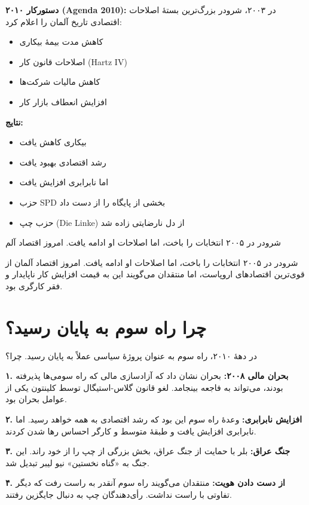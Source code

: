 \textbf{دستورکار ۲۰۱۰ (Agenda 2010):}
در ۲۰۰۳، شرودر بزرگ‌ترین بستهٔ اصلاحات اقتصادی تاریخ آلمان را اعلام کرد:
\begin{itemize}
    \item کاهش مدت بیمهٔ بیکاری
    \item اصلاحات قانون کار (Hartz IV)
    \item کاهش مالیات شرکت‌ها
    \item افزایش انعطاف بازار کار
\end{itemize}

\textbf{نتایج:}
\begin{itemize}
    \item بیکاری کاهش یافت
    \item رشد اقتصادی بهبود یافت
    \item اما نابرابری افزایش یافت
    \item حزب SPD بخشی از پایگاه را از دست داد
    \item حزب چپ (Die Linke) از دل نارضایتی زاده شد
\end{itemize}

شرودر در ۲۰۰۵ انتخابات را باخت، اما اصلاحات او ادامه یافت. امروز اقتصاد آلم

شرودر در ۲۰۰۵ انتخابات را باخت، اما اصلاحات او ادامه یافت. امروز اقتصاد آلمان از قوی‌ترین اقتصادهای اروپاست، اما منتقدان می‌گویند این به قیمت افزایش کار ناپایدار و فقر کارگری بود.


\section{چرا راه سوم به پایان رسید؟}


در دههٔ ۲۰۱۰، راه سوم به عنوان پروژهٔ سیاسی عملاً به پایان رسید. چرا؟

\textbf{۱. بحران مالی ۲۰۰۸:}
بحران نشان داد که آزادسازی مالی که راه سومی‌ها پذیرفته بودند، می‌تواند به فاجعه بینجامد. لغو قانون گلاس-استیگال توسط کلینتون یکی از عوامل بحران بود.

\textbf{۲. افزایش نابرابری:}
وعدهٔ راه سوم این بود که رشد اقتصادی به همه خواهد رسید. اما نابرابری افزایش یافت و طبقهٔ متوسط و کارگر احساس رها شدن کردند.

\textbf{۳. جنگ عراق:}
بلر با حمایت از جنگ عراق، بخش بزرگی از چپ را از خود راند. این جنگ به «گناه نخستین» نیو لیبر تبدیل شد.

\textbf{۴. از دست دادن هویت:}
منتقدان می‌گویند راه سوم آنقدر به راست رفت که دیگر تفاوتی با راست نداشت. رأی‌دهندگان چپ به دنبال جایگزین رفتند.

